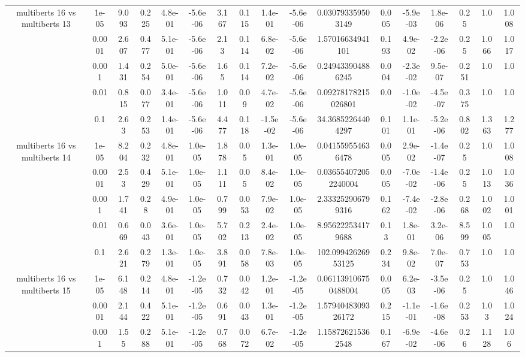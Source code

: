 \begin{tabular}{|c|c|c|c|c|c|c|c|c|c|c|c|c|c|c|c|c|}
\hline
\multirow{5}{*}{multiberts 16 vs multiberts 13} & 1e-05 & 9.093 & 0.225 & 4.8e-01 & -5.6e-06 & 3.167 & 0.115 & 1.4e-01 & -5.6e-06 & 0.030793359503149 & 0.005 & -5.9e-03 & 1.8e-06 & 0.25 & 1.0 & 1.008 \\
 & 0.0001 & 2.607 & 0.477 & 5.1e-01 & -5.6e-06 & 2.13 & 0.114 & 6.8e-02 & -5.6e-06 & 1.57016634941101 & 0.193 & 4.9e-02 & -2.2e-06 & 0.25 & 1.066 & 1.017 \\
 & 0.001 & 1.431 & 0.254 & 5.0e-01 & -5.6e-06 & 1.65 & 0.114 & 7.2e-02 & -5.6e-06 & 0.249433904886245 & 0.004 & -2.3e-02 & 9.5e-07 & 0.251 & 1.0 & 1.0 \\
 & 0.01 & 0.815 & 0.077 & 3.4e-01 & -5.6e-06 & 1.011 & 0.09 & 4.7e-02 & -5.6e-06 & 0.09278178215026801 & 0.0 & -1.0e-02 & -4.5e-07 & 0.375 & 1.0 & 1.0 \\
 & 0.1 & 2.63 & 0.253 & 1.4e-01 & -5.6e-06 & 4.477 & 0.118 & -1.5e-02 & -5.6e-06 & 34.36852264404297 & 0.101 & 1.1e-01 & -5.2e-06 & 0.802 & 1.363 & 1.277 \\
\hline
\multirow{5}{*}{multiberts 16 vs multiberts 14} & 1e-05 & 8.204 & 0.232 & 4.8e-01 & 1.0e-05 & 1.878 & 0.05 & 1.3e-01 & 1.0e-05 & 0.041559554636478 & 0.005 & 2.9e-02 & -1.4e-07 & 0.25 & 1.0 & 1.008 \\
 & 0.0001 & 2.53 & 0.429 & 5.1e-01 & 1.0e-05 & 1.111 & 0.05 & 8.4e-02 & 1.0e-05 & 0.036554072052240004 & 0.005 & -7.0e-02 & -1.4e-06 & 0.25 & 1.013 & 1.036 \\
 & 0.001 & 1.741 & 0.28 & 4.9e-01 & 1.0e-05 & 0.799 & 0.053 & 7.9e-02 & 1.0e-05 & 2.333252906799316 & 0.162 & -7.4e-02 & -2.8e-06 & 0.268 & 1.002 & 1.001 \\
 & 0.01 & 0.669 & 0.043 & 3.6e-01 & 1.0e-05 & 5.702 & 0.213 & 2.4e-02 & 1.0e-05 & 8.956222534179688 & 0.13 & 1.8e-01 & 3.2e-06 & 8.599 & 1.005 & 1.0 \\
 & 0.1 & 2.621 & 0.279 & 1.3e-01 & 1.0e-05 & 3.891 & 0.058 & 7.8e-03 & 1.0e-05 & 102.09942626953125 & 0.234 & 9.8e-02 & 7.0e-07 & 0.753 & 1.0 & 1.0 \\
\hline
\multirow{5}{*}{multiberts 16 vs multiberts 15} & 1e-05 & 6.148 & 0.214 & 4.8e-01 & -1.2e-05 & 0.732 & 0.042 & 1.2e-01 & -1.2e-05 & 0.061139106750488004 & 0.005 & 6.2e-03 & -3.5e-06 & 0.25 & 1.0 & 1.046 \\
 & 0.0001 & 2.144 & 0.422 & 5.1e-01 & -1.2e-05 & 0.691 & 0.043 & 1.3e-01 & -1.2e-05 & 1.5794048309326172 & 0.215 & -1.1e-01 & -1.6e-08 & 0.253 & 1.03 & 1.024 \\
 & 0.001 & 1.55 & 0.288 & 5.1e-01 & -1.2e-05 & 0.768 & 0.072 & 6.7e-02 & -1.2e-05 & 1.158726215362548 & 0.167 & -6.9e-02 & -4.6e-06 & 0.26 & 1.128 & 1.06 \\

\end{tabular}
